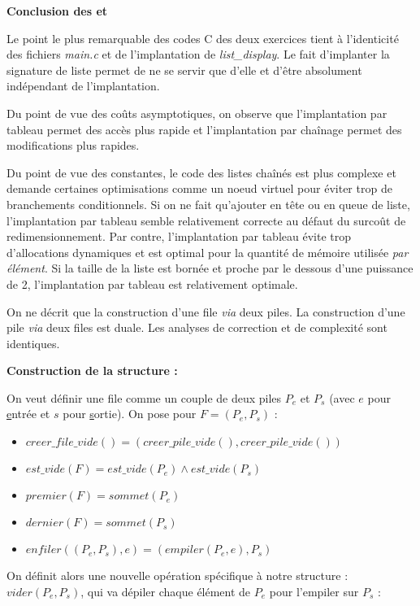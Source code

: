 \documentclass[../main.tex]{subfiles}
\begin{document}
 \textbf{Conclusion des  et }

 Le point le plus remarquable des codes C des deux exercices tient à l'identicité des fichiers \textit{main.c} et de l'implantation de \textit{list\_display}. Le fait d'implanter la signature de liste permet de ne se servir que d'elle et d'être absolument indépendant de l'implantation.

 Du point de vue des coûts asymptotiques, on observe que l'implantation par tableau permet des accès plus rapide et l'implantation par chaînage permet des modifications plus rapides.

 Du point de vue des constantes, le code des listes chaînés est plus complexe et demande certaines optimisations comme un noeud virtuel pour éviter trop de branchements conditionnels. Si on ne fait qu'ajouter en tête ou en queue de liste, l'implantation par tableau semble relativement correcte au défaut du surcoût de redimensionnement. Par contre, l'implantation par tableau évite trop d'allocations dynamiques et est optimal pour la quantité de mémoire utilisée \textit{par élément}. Si la taille de la liste est bornée et proche par le dessous d'une puissance de 2, l'implantation par tableau est relativement optimale.




On ne décrit que la construction d'une file \textit{via} deux piles. La construction d'une pile \textit{via} deux files est duale. Les analyses de correction et de complexité sont identiques.

\textbf{Construction de la structure :}

On veut définir une file comme un couple de deux piles $P_e$ et $P_s$ (avec $e$ pour \underline{e}ntrée et $s$ pour \underline{s}ortie). On pose pour $F = (P_e, P_s)$ :
\begin{itemize}
	\item $creer\_file\_vide() = (creer\_pile\_vide(), creer\_pile\_vide())$
	\item $est\_vide(F) = est\_vide(P_e)\wedge est\_vide(P_s)$
	\item $premier(F) = sommet(P_e)$
	\item $dernier(F) = sommet(P_s)$
	\item $enfiler((P_e, P_s), e) = (empiler(P_e, e), P_s)$
\end{itemize}
On définit alors une nouvelle opération spécifique à notre structure : $vider(P_e, P_s)$, qui va dépiler chaque élément de $P_e$ pour l'empiler sur $P_s$ :
\end{document}
